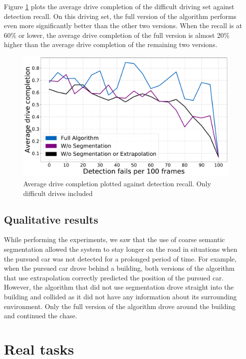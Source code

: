 \documentclass{ctuthesis/ctuthesis}
\begin{document}
Figure \ref{f:detection_recall_difficult} plots the average drive completion of the difficult driving set against detection recall. On this driving set, the full version of the algorithm performs even more significantly better than the other two versions. When the recall is at 60\% or lower, the average drive completion of the full version is almost 20\% higher than the average drive completion of the remaining two versions.

\begin{figure}[]
    \centering
    \includegraphics[width=1\textwidth]{images/recall_chart7_difficult.pdf}
    
    \caption{Average drive completion plotted against detection recall. Only difficult drives included}\label{f:detection_recall_difficult}
\end{figure}


\subsection{Qualitative results}
While performing the experiments, we saw that the use of coarse semantic segmentation allowed the system to stay longer on the road in situations when the pursued car was not detected for a prolonged period of time. For example, when the pursued car drove behind a building, both versions of the algorithm that use extrapolation correctly predicted the position of the pursued car. However, the algorithm that did not use segmentation drove straight into the building and collided as it did not have any information about its surrounding environment. Only the full version of the algorithm drove around the building and continued the chase.




\section{Real tasks}
\end{document}
